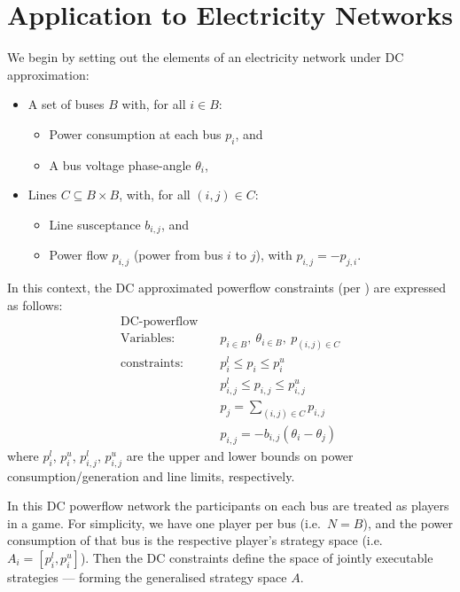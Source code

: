 \documentclass[
10pt, %
a4paper, %
oneside, %
headinclude,footinclude, %
BCOR5mm, %
]{scrartcl}
\begin{document}
\section{Application to Electricity Networks}


We begin by setting out the elements of an electricity network under DC approximation:
\begin{itemize}
    \item A set of buses $B$ with, for all $i\in B$:
    \begin{itemize} 
        \item Power consumption at each bus $p_i$, and 
        \item A bus voltage phase-angle $\theta_i$,
    \end{itemize}
    \item Lines $C\subseteq B\times B$, with, for all $(i,j)\in C$: 
        \begin{itemize} 
        \item Line susceptance $b_{i,j}$, and 
        \item Power flow $p_{i,j}$ (power from bus $i$ to $j$), with $p_{i,j}=-p_{j,i}$. 
    \end{itemize}
\end{itemize}
In this context, the DC approximated powerflow constraints (per \cite{Wang1}) are expressed as follows:
\begin{equation}
\label{dcopf1}
\begin{aligned}
\text{DC-powerflow} \quad& \\
\text{Variables:} \quad&  p_{i\in B},\ \theta_{i\in B},\ p_{(i,j)\in C} \\
\text{constraints:} \quad& p_i^{l}\le p_i \le p_i^{u} \\
&p_{i,j}^l \le p_{i,j} \le p_{i,j}^u \\
&p_j = \sum_{(i,j)\in C}p_{i,j}\\
&p_{i,j} = -b_{i,j}(\theta_i - \theta_j)
\end{aligned}
\end{equation}
where $p_i^{l}$, $p_i^{u}$, $p_{i,j}^l$, $p_{i,j}^u$ are the upper and lower bounds on power consumption/generation and line limits, respectively.

In this DC powerflow network the participants on each bus are treated as players in a game.
For simplicity, we have one player per bus (i.e.~$N=B$), and the power consumption of that bus is the respective player's strategy space (i.e.\ $A_i=[p_i^l,p_i^u]$).
Then the DC constraints define the space of jointly executable strategies --- forming the generalised strategy space $A$.
\end{document}
